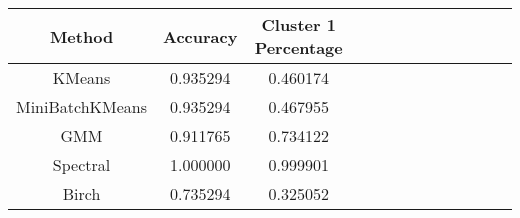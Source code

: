 \begin{tabular}{ccccccccccccc}
\toprule
         Method &  Accuracy &  Cluster 1 Percentage \\
\midrule
         KMeans &  0.935294 &              0.460174 \\
MiniBatchKMeans &  0.935294 &              0.467955 \\
            GMM &  0.911765 &              0.734122 \\
       Spectral &  1.000000 &              0.999901 \\
          Birch &  0.735294 &              0.325052 \\
\bottomrule
\end{tabular}
